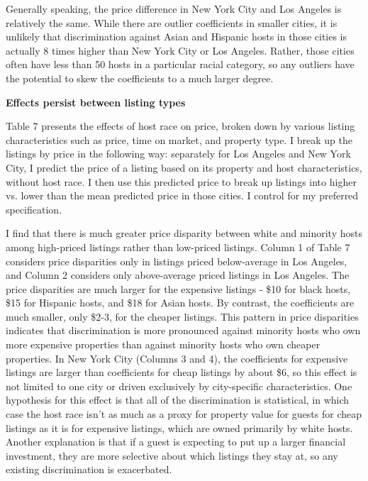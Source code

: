 \documentclass[11pt, oneside]{article}
\begin{document}
Generally speaking, the price difference in New York City and Los Angeles is relatively the same. While there are outlier coefficients in smaller cities, it is unlikely that discrimination against Asian and Hispanic hosts in those cities is actually 8 times higher than New York City or Los Angeles. Rather, those cities often have less than 50 hosts in a particular racial category, so any outliers have the potential to skew the coefficients to a much larger degree.  

\textbf{Effects persist between listing types}

Table 7 presents the effects of host race on price, broken down by various listing characteristics such as price, time on market, and property type. I break up the listings by price in the following way: separately for Los Angeles and New York City, I predict the price of a listing based on its property and host characteristics, without host race. I then use this predicted price to break up listings into higher vs. lower than the mean predicted price in those cities. I control for my preferred specification.  

I find that there is much greater price disparity between white and minority hosts among high-priced listings rather than low-priced listings. Column 1 of Table 7 considers price disparities only in listings priced below-average in Los Angeles, and Column 2 considers only above-average priced listings in Los Angeles. The price disparities are much larger for the expensive listings - \$10 for black hosts, \$15 for Hispanic hosts, and \$18 for Asian hosts. By contrast, the coefficients are much smaller, only \$2-3, for the cheaper listings. This pattern in price disparities indicates that discrimination is more pronounced against minority hosts who own more expensive properties than against minority hosts who own cheaper properties. In New York City (Columns 3 and 4), the coefficients for expensive listings are larger than coefficients for cheap listings by about \$6, so this effect is not limited to one city or driven exclusively by city-specific characteristics. One hypothesis for this effect is that all of the discrimination is statistical, in which case the host race isn't as much as a proxy for property value for guests for cheap listings  as it is for expensive listings, which are owned primarily by white hosts. Another explanation is that if a guest is expecting to put up a larger financial investment, they are more selective about which listings they stay at, so any existing discrimination is exacerbated. 
\end{document}
